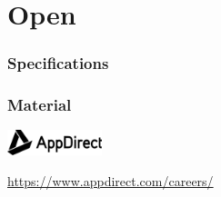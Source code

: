 \documentclass{beamer}
\begin{document}
\section{Open}
\nocite{*}
\begin{frame}
  \frametitle{Specifications}
  \printbibliography[keyword=spec]
\end{frame}

\begin{frame}
  \frametitle{Material}
  \printbibliography[keyword=material]

  \begin{center}
    \vspace{1em}
    \includegraphics[height=2em]{AppDirect}
    
    \url{https://www.appdirect.com/careers/}
  \end{center}
\end{frame}
\end{document}
